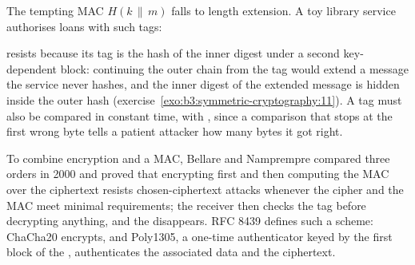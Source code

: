 The tempting MAC $H(k \,\|\, m)$ falls to length extension. A toy library service authorises loans with such tags:

\label{lst:b3:symmetric-cryptography:lengthext}

\label{out:b3:symmetric-cryptography:lengthext}

 resists because its tag is the hash of the inner digest under a second key-dependent block: continuing the outer chain from the tag would extend a message the service never hashes, and the inner digest of the extended message is hidden inside the outer hash (exercise~\ref{exo:b3:symmetric-cryptography:11}). %
A tag must also be compared in constant time, with , since a comparison that stops at the first wrong byte tells a patient attacker how many bytes it got right.

To combine encryption and a MAC, Bellare and Namprempre compared three orders in 2000 and proved that encrypting first and then computing the MAC over the ciphertext resists chosen-ciphertext attacks whenever the cipher and the MAC meet minimal requirements; the receiver then checks the tag before decrypting anything, and the  disappears. %
RFC 8439 defines such a scheme: ChaCha20 encrypts, and Poly1305, a one-time authenticator keyed by the first  block of the , authenticates the associated data and the ciphertext.

\label{lst:b3:symmetric-cryptography:aead}

\label{out:b3:symmetric-cryptography:aead}

